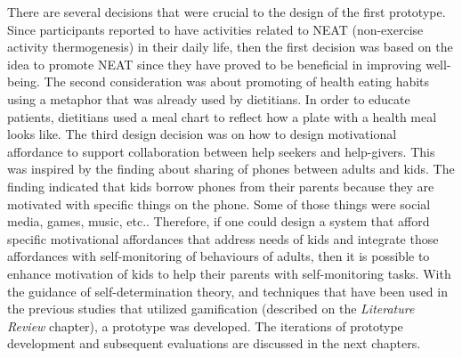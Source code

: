 There are several decisions that were crucial to the design of the first prototype.  Since participants reported to have activities related to NEAT (non-exercise activity thermogenesis) in their daily life, then  the first decision was based on the idea to promote NEAT since they have proved to be beneficial in improving well-being. The second consideration was about  promoting of health eating habits using a metaphor that was already used by dietitians. In order to educate patients, dietitians used a meal chart to reflect how a plate with a health meal looks like. The third design decision was on how to design motivational affordance to support collaboration between help seekers and help-givers. This was inspired by the finding about sharing of phones between adults and kids. The finding indicated that kids borrow phones from their parents because they are motivated with specific things on the phone. Some of those things were social media, games, music, etc.. Therefore, if one could design a system that afford specific motivational affordances that address needs of kids and integrate those affordances with self-monitoring of behaviours of adults, then it is possible to enhance motivation of kids to help their parents with self-monitoring tasks. With the guidance of self-determination theory, and techniques that have been used in the previous studies that utilized gamification (described on the \emph{Literature Review} chapter), a prototype was developed. The iterations of prototype development and subsequent evaluations are discussed in the next chapters.

\begin{flushright}
\end{flushright}